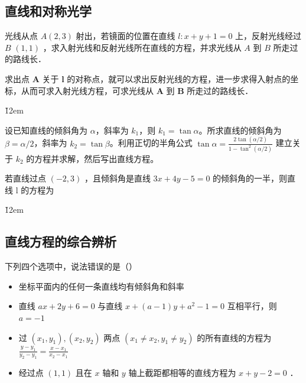 \subsection{直线和对称光学}

\begin{example}
    光线从点 $A(2,3)$ 射出，若镜面的位置在直线 $l: x+y+1=0$ 上，反射光线经过 $B$ $(1,1)$ ，求入射光线和反射光线所在直线的方程，并求光线从 $A$ 到 $B$ 所走过的路线长．
\end{example}

\begin{tips}
    求出点 $\boldsymbol{A}$ 关于 $\boldsymbol{l}$ 的对称点，就可以求出反射光线的方程，进一步求得入射点的坐标，从而可求入射光线方程，可求光线从 $\boldsymbol{A}$ 到 $\boldsymbol{B}$ 所走过的路线长．
\end{tips}

\v{12em}

\begin{theorem}[斜率与半角公式]
    设已知直线的倾斜角为 $\alpha$，斜率为 $k_1$，则 $k_1=\tan\alpha$。所求直线的倾斜角为 $\beta = \alpha/2$，斜率为 $k_2 = \tan\beta$。利用正切的半角公式 $\tan\alpha = \frac{2\tan(\alpha/2)}{1-\tan^2(\alpha/2)}$ 建立关于 $k_2$ 的方程并求解，然后写出直线方程。
\end{theorem}

\begin{example}
    若直线过点 $(-2,3)$ ，且倾斜角是直线 $3 x+4 y-5=0$ 的倾斜角的一半，则直线 l 的方程为 $\qquad$
\end{example}

\v{12em}

\subsection{直线方程的综合辨析}

\begin{example}
    下列四个选项中，说法错误的是（\hspace{2em}）
    \begin{itemize}
        \item  坐标平面内的任何一条直线均有倾斜角和斜率
        \item  直线 $a x+2 y+6=0$ 与直线 $x+(a-1) y+a^2-1=0$ 互相平行，则 $a=-1$
        \item  过 $\left(x_1, y_1\right),\left(x_2, y_2\right)$ 两点 $\left(x_1 \neq x_2, y_1 \neq y_2\right)$ 的所有直线的方程为 $\frac{y-y_1}{y_2-y_1}=\frac{x-x_1}{x_2-x_1}$
        \item  经过点 $(1,1)$ 且在 $x$ 轴和 $y$ 轴上截距都相等的直线方程为 $x+y-2=0$ ．
    \end{itemize}
\end{example}

